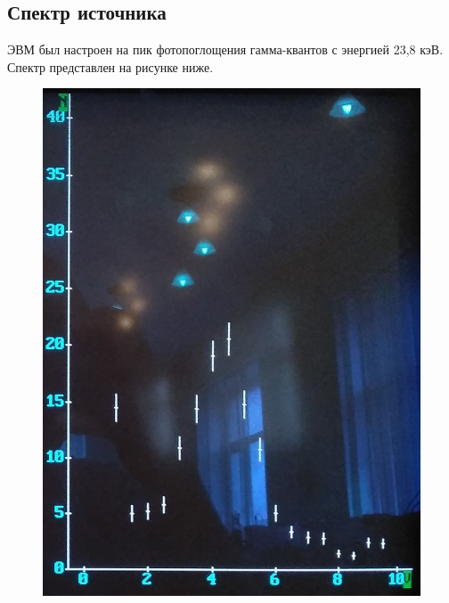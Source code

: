 \documentclass[a4paper,12pt]{article} %
\begin{document}
	\subsection{Спектр источника}
		ЭВМ был настроен на пик фотопоглощения гамма-квантов с энергией 23,8 кэВ. Спектр представлен на рисунке ниже.
		\begin{figure}[h!]
			\begin{floatrow}
				{\includegraphics[scale=0.4]{graph0.jpg}}    
			\end{floatrow}
		\end{figure}
	
\end{document}
